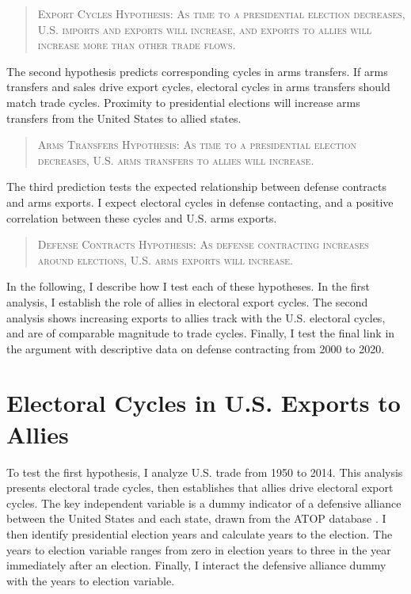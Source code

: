 \documentclass[12pt]{article}
\begin{document}
\begin{quote}
\textsc{Export Cycles Hypothesis: As time to a presidential election decreases, U.S. imports and exports will increase, and exports to allies will increase more than other trade flows.}
\end{quote}



The second hypothesis predicts corresponding cycles in arms transfers.
If arms transfers and sales drive export cycles, electoral cycles in arms transfers should match trade cycles.
Proximity to presidential elections will increase arms transfers from the United States to allied states. 


\begin{quote}
\textsc{Arms Transfers Hypothesis: As time to a presidential election decreases, U.S. arms transfers to allies will increase.}
\end{quote}


The third prediction tests the expected relationship between defense contracts and arms exports. 
I expect electoral cycles in defense contacting, and a positive correlation between these cycles and U.S. arms exports.


\begin{quote}
\textsc{Defense Contracts Hypothesis: As defense contracting increases around elections, U.S. arms exports will increase.}
\end{quote}



In the following, I describe how I test each of these hypotheses. 
In the first analysis, I establish the role of allies in electoral export cycles. 
The second analysis shows increasing exports to allies track with the U.S. electoral cycles, and are of comparable magnitude to trade cycles.
Finally, I test the final link in the argument with descriptive data on defense contracting from 2000 to 2020.




\section{Electoral Cycles in U.S. Exports to Allies}

To test the first hypothesis, I analyze U.S. trade from 1950 to 2014. 
This analysis presents electoral trade cycles, then establishes that allies drive electoral export cycles.
The key independent variable is a dummy indicator of a defensive alliance between the United States and each state, drawn from the ATOP database \citep{Leedsetal2002}.
I then identify presidential election years and calculate years to the election.
The years to election variable ranges from zero in election years to three in the year immediately after an election.
Finally, I interact the defensive alliance dummy with the years to election variable.
\end{document}
